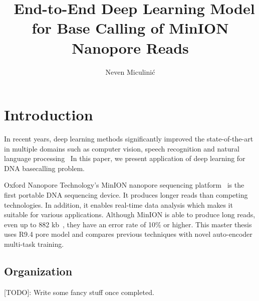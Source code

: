 \documentclass[times, utf8, diplomski, english]{fer}
\begin{document}
\title{ End-to-End Deep Learning Model for Base Calling of MinION Nanopore Reads}
\author{Neven Miculinić}
\maketitle
 
\izvornik


\tableofcontents
\listoffigures
\listoftables

\chapter{Introduction}
\label{chap:Introduction}
In recent years, deep learning methods significantly improved the state-of-the-art in multiple domains such as computer vision, speech recognition and natural language processing~\citep{LeCun:1998:CNI:303568.303704, NIPS2012_4824}
In this paper, we present application of deep learning for DNA basecalling problem.

Oxford Nanopore Technology's MinION nanopore sequencing platform~\cite{mikheyev2014first} is the first portable DNA sequencing device. It produces longer reads than competing technologies. In addition, it enables real-time data analysis which makes it suitable for various applications.
Although MinION is able to produce long reads, even up to 882 kb~\cite{loman1-100k,loman2-800k}, they have an error rate of 10\% or higher. This master thesis uses R9.4 pore model and compares previous techniques with novel auto-encoder multi-task training. 

\section{Organization}
[TODO]: Write some fancy stuff once completed.

\end{document}
